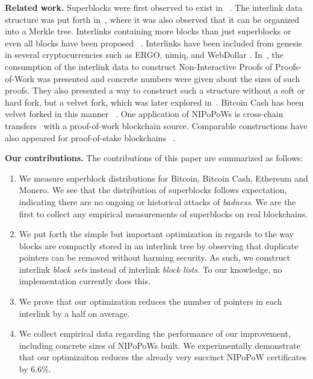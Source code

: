 \noindent
\textbf{Related work.}
Superblocks were first observed to exist in~\cite{highway} .
The interlink data structure was put forth in~\cite{popow}, where it was also
observed that it can be organized into a Merkle tree. Interlinks containing more
blocks than just superblocks or even all blocks have been
proposed~\cite{vitalik-eip,flyclient} . Interlinks have
been included from genesis in several cryptocurrencies such as ERGO, nimiq, and
WebDollar . In~\cite{nipopows}, the consumption of the
interlink data to construct Non-Interactive Proofs of Proofs-of-Work was
presented and concrete numbers were given about the sizes of such proofs. They
also presented a way to construct such a structure without a soft or hard fork,
but a velvet fork, which was later explored in~\cite{velvet}. Bitcoin Cash has
been velvet forked in this manner~\cite{gtklocker} . One
application of NIPoPoWs is cross-chain transfers~\cite{pow-sidechains}
 with a proof-of-work blockchain source. Comparable
constructions have also appeared for proof-of-stake
blockchains~\cite{pos-sidechains} .

\noindent
\textbf{Our contributions.} The contributions of this paper are summarized as
follows:

\begin{enumerate}
  \item We measure superblock distributions for Bitcoin, Bitcoin Cash, Ethereum
        and Monero. We see that the distribution of superblocks follows
        expectation, indicating there are no ongoing or historical attacks of
        \emph{badness}. We are the first to collect any empirical measurements
        of superblocks on real blockchains.
  \item We put forth the simple but important optimization in regards to the way
        blocks are compactly stored in an interlink tree by observing that
        duplicate pointers can be removed without harming security. As such, we
        construct interlink \emph{block sets} instead of interlink \emph{block
        lists}. To our knowledge, no implementation currently does this.
  \item We prove that our optimization reduces the number of pointers in each
        interlink by a half on average.
  \item We collect empirical data regarding the performance of our improvement,
        including concrete sizes of NIPoPoWs built. We experimentally
        demonstrate that our optimizaiton reduces the already very succinct
        NIPoPoW certificates by $6.6\%$.
\end{enumerate}
